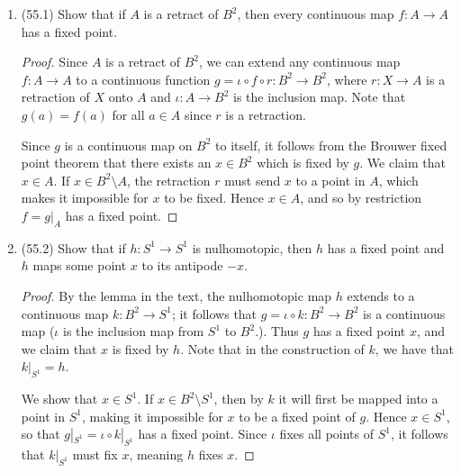 \documentclass[11pt]{article}
\begin{document}
\begin{enumerate}
\begin{proof}
      Because the component maps of $p$ are periodic in the integers, we have that $\tilde{\tilde{g}}$ is a lifting of $g$, but beginning at $n$. By the pasting lemma it follows that $\tilde{f}\ast\tilde{g}$ is defined and is a valid lifting of $f\ast g$ (by the first exercise) beginning at $0$ and ending at $(n_1+m_1,n_2+m_2)$. It follows that \[\phi([f]\ast[g]) = (n_1+m_1,n_2+m_2) = (n_1,n_2) + (m_1,m_2) = \phi([f]) + \phi([g]).\] Hence $\phi$ is an isomorphism as desired and the fundamental group of the torus is isomorphic to $\mathbb{Z}\times\mathbb{Z}$.
    \end{proof}
    \item (55.1) Show that if $A$ is a retract of $B^2$, then every continuous map $f\colon A\to A$ has a fixed point.
    \begin{proof}
      Since $A$ is a retract of $B^2$, we can extend any continuous map $f\colon A\to A$ to a continuous function $g = \iota\circ f\circ r \colon B^2\to B^2$, where $r \colon X\to A$ is a retraction of $X$ onto $A$ and $\iota \colon A \to B^2$ is the inclusion map. Note that $g(a) = f(a)$ for all $a\in A$ since $r$ is a retraction.

      Since $g$ is a continuous map on $B^2$ to itself, it follows from the Brouwer fixed point theorem that there exists an $x\in B^2$ which is fixed by $g$. We claim that $x\in A$. If $x\in B^2\setminus A$, the retraction $r$ must send $x$ to a point in $A$, which makes it impossible for $x$ to be fixed. Hence $x\in A$, and so by restriction $f = g|_A$ has a fixed point.
    \end{proof}
    \item (55.2) Show that if $h\colon S^1\to S^1$ is nulhomotopic, then $h$ has a fixed point and $h$ maps some point $x$ to its antipode $-x$.
    \begin{proof}
      By the lemma in the text, the nulhomotopic map $h$ extends to a continuous map $k\colon B^2\to S^1$; it follows that $g = \iota\circ k\colon B^2\to B^2$ is a continuous map ($\iota$ is the inclusion map from $S^1$ to $B^2$.). Thus $g$ has a fixed point $x$, and we claim that $x$ is fixed by $h$. Note that in the construction of $k$, we have that $k|_{S^1} = h$.

      We show that $x\in S^1$. If $x\in B^2\setminus S^1$, then by $k$ it will first be mapped into a point in $S^1$, making it impossible for $x$ to be a fixed point of $g$. Hence $x\in S^1$, so that $g|_{S^1} = \iota \circ k|_{S^1}$ has a fixed point. Since $\iota$ fixes all points of $S^1$, it follows that $k|_{S^1}$ must fix $x$, meaning $h$ fixes $x$.


\end{proof}
\end{enumerate}
\end{document}
